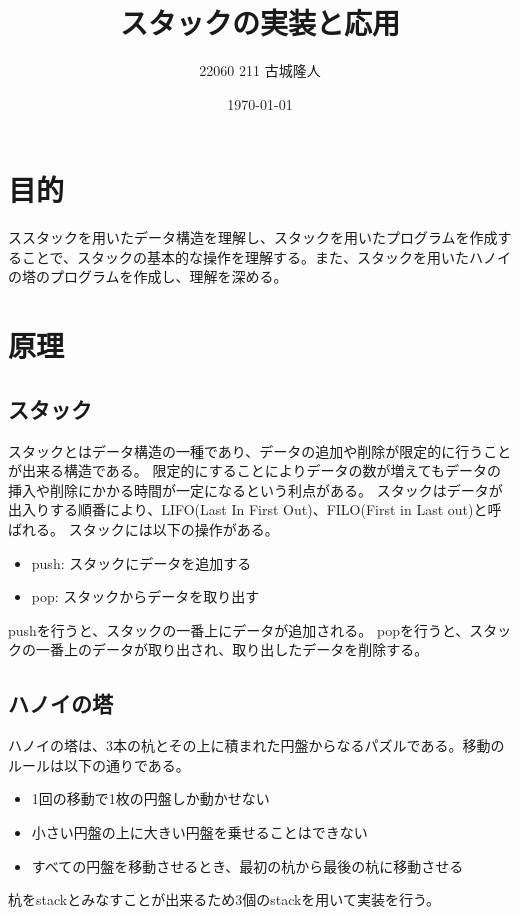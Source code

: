 \documentclass[dvipdfmx]{jsarticle}
\begin{document}
\title{スタックの実装と応用}
\author{22060 211 古城隆人}
\date{\today}
\maketitle

\tableofcontents

\newpage


\section{目的}
ススタックを用いたデータ構造を理解し、スタックを用いたプログラムを作成することで、スタックの基本的な操作を理解する。また、スタックを用いたハノイの塔のプログラムを作成し、理解を深める。
\section{原理}
\subsection{スタック}
スタックとはデータ構造の一種であり、データの追加や削除が限定的に行うことが出来る構造である。
限定的にすることによりデータの数が増えてもデータの挿入や削除にかかる時間が一定になるという利点がある。
スタックはデータが出入りする順番により、LIFO(Last In First Out)、FILO(First in Last out)と呼ばれる。
スタックには以下の操作がある。
\begin{itemize}
  \item push: スタックにデータを追加する
  \item pop: スタックからデータを取り出す
\end{itemize}
pushを行うと、スタックの一番上にデータが追加される。
popを行うと、スタックの一番上のデータが取り出され、取り出したデータを削除する。
\subsection{ハノイの塔}\label{sec:mysection}
ハノイの塔は、3本の杭とその上に積まれた円盤からなるパズルである。移動のルールは以下の通りである。
\begin{itemize}
  \item 1回の移動で1枚の円盤しか動かせない
  \item 小さい円盤の上に大きい円盤を乗せることはできない
  \item すべての円盤を移動させるとき、最初の杭から最後の杭に移動させる
\end{itemize}
杭をstackとみなすことが出来るため3個のstackを用いて実装を行う。
\end{document}
